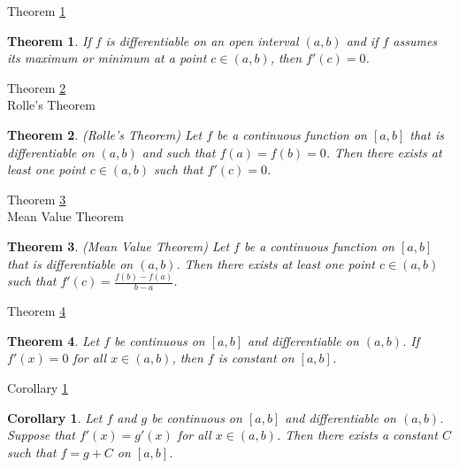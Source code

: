 \documentclass[avery5371,grid]{flashcards}
\newtheorem{corollary}{Corollary}
\newtheorem{theorem}{Theorem}
\begin{document}
\begin{flashcard}[Theorem]{Theorem \ref{thm83}}
\begin{theorem}
\label{thm83}
If $f$ is differentiable on an open interval $(a,b)$ and if $f$ assumes
its maximum or minimum at a point $c \in (a,b)$, then $f'(c) = 0$.
\end{theorem}
\end{flashcard}

\begin{flashcard}[Theorem]{Theorem \ref{thm84}\\ Rolle's Theorem}
\begin{theorem}
\label{thm84}
(Rolle's Theorem)  Let $f$ be a continuous function on $[a,b]$ that is
differentiable on $(a,b)$ and such that $f(a) = f(b) = 0$.  Then there
exists at least one point $c \in (a,b)$ such that $f'(c) = 0$.
\end{theorem}
\end{flashcard}

\begin{flashcard}[Theorem]{Theorem \ref{thm85}\\ Mean Value Theorem}
\begin{theorem}
\label{thm85}
(Mean Value Theorem)  Let $f$ be a continuous function on $[a,b]$ that
is differentiable on $(a,b)$.  Then there exists at least one point $c
\in (a,b)$ such that $f'(c) = \frac{f(b) - f(a)}{b-a}$.
\end{theorem}
\end{flashcard}

\begin{flashcard}[Theorem]{Theorem \ref{thm86}}
\begin{theorem}
\label{thm86}
Let $f$ be continuous on $[a,b]$ and differentiable on $(a,b)$.  If
$f'(x) = 0$ for all $x \in (a,b)$, then $f$ is constant on $[a,b]$.
\end{theorem}
\end{flashcard}

\begin{flashcard}[Corollary]{Corollary \ref{cor06}}
\begin{corollary}
\label{cor06}
Let $f$ and $g$ be continuous on $[a,b]$ and differentiable on $(a,b)$.
Suppose that $f'(x) = g'(x)$ for all $x \in (a,b)$.  Then there exists a
constant $C$ such that $f=g+C$ on $[a,b]$.
\end{corollary}
\end{flashcard}
\end{document}
